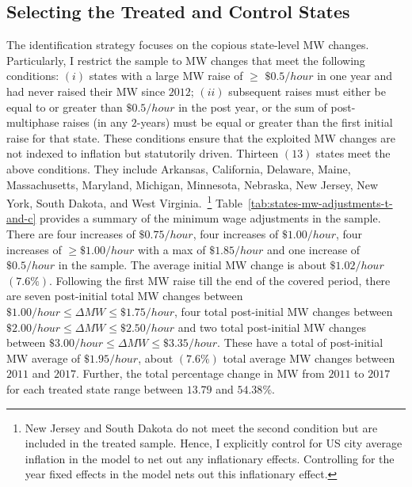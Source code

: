 \documentclass[12pt, english]{article}
\begin{document}
    \subsection{Selecting the Treated and Control States}\label{subsec:selecting-the-treated-and-control-states}
    The identification strategy focuses on the copious state-level MW changes. Particularly, I restrict the sample to MW changes that meet the following conditions: $(i)$ states with a large MW raise of $\geq$ $\$0.5/hour$ in one year and had never raised their MW since $2012$; $(ii)$ subsequent raises must either be equal to or greater than $\$0.5/hour$ in the post year, or the sum of post-multiphase raises (in any $2$-years) must be equal or greater than the first initial raise for that state. These conditions ensure that the exploited MW changes are not indexed to inflation but statutorily driven. Thirteen $(13)$ states meet the above conditions. They include Arkansas, California, Delaware, Maine, Massachusetts, Maryland, Michigan, Minnesota, Nebraska, New Jersey, New York, South Dakota, and West Virginia.~\footnote{\tiny New Jersey and South Dakota do not meet the second condition but are included in the treated sample. Hence, I explicitly control for US city average inflation in the model to net out any inflationary effects. Controlling for the year fixed effects in the model nets out this inflationary effect.} Table~\ref{tab:states-mw-adjustments-t-and-c} provides a summary of the minimum wage adjustments in the sample. There are four increases of $\$0.75/hour$, four increases of $\$1.00/hour$, four increases of $\geq \$1.00/hour$ with a max of $\$1.85/hour$ and one increase of $\$0.5/hour$ in the sample. The average initial MW change is about $\$1.02/hour$ $(7.6\%)$. Following the first MW raise till the end of the covered period, there are seven post-initial total MW changes between $\$1.00/hour \leq \Delta MW \leq \$1.75/hour$, four total post-initial MW changes between $\$2.00/hour \leq \Delta MW \leq \$2.50/hour$ and two total post-initial MW changes between $\$3.00/hour \leq \Delta MW \leq \$3.35/hour$. These have a total of post-initial MW average of $\$1.95/hour$, about $(7.6\%)$ total average MW changes between $2011$ and $2017$. Further, the total percentage change in MW from $2011$ to $2017$ for each treated state range between $13.79$ and $54.38\%$.
    
\end{document}
